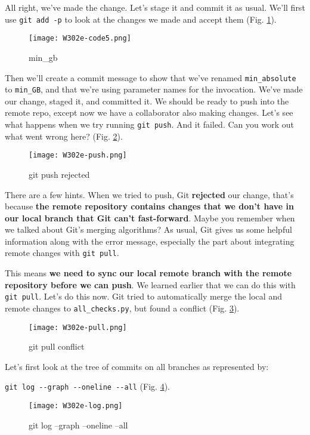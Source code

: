 All right, we've made the change. Let's stage it and commit it as usual. We'll first use \verb|git add -p| to look at the changes we made and accept them (Fig. \ref{W302e-code5}).

\begin{figure} 
	\caption{min\_gb}
	\centering
	\texttt{[image: W302e-code5.png]}
	\label{W302e-code5}
\end{figure}

Then we'll create a commit message to show that we've renamed \verb|min_absolute| to \verb|min_GB|, and that we're using parameter names for the invocation.
We've made our change, staged it, and committed it. We should be ready to push into the remote repo, except now we have a collaborator also making changes. Let's see what happens when we try running \verb|git push|. And it failed. Can you work out what went wrong here? (Fig. \ref{W302e-push}).

\begin{figure} 
	\caption{git push rejected}
	\centering
	\texttt{[image: W302e-push.png]}
	\label{W302e-push}
\end{figure}

There are a few hints. When we tried to push, Git \textbf{rejected} our change, that's because \textbf{the remote repository contains changes that we don't have in our local branch that Git can't fast-forward}. Maybe you remember when we talked about Git's merging algorithms? As usual, Git gives us some helpful information along with the error message, especially the part about integrating remote changes with \verb|git pull|.

This means \textbf{we need to sync our local remote branch with the remote repository before we can push}. We learned earlier that we can do this with \verb|git pull|. Let's do this now. Git tried to automatically merge the local and remote changes to \verb|all_checks.py|, but found a conflict (Fig. \ref{W302e-pull}). 

\begin{figure} 
	\caption{git pull conflict}
	\centering
	\texttt{[image: W302e-pull.png]}
	\label{W302e-pull}
\end{figure}


Let's first look at the tree of commits on all branches as represented by:

\verb|git log --graph --oneline --all| (Fig. \ref{W302e-log}). 

\begin{figure} 
	\caption{git log --graph --oneline --all}
	\centering
	\texttt{[image: W302e-log.png]}
	\label{W302e-log}
\end{figure}

